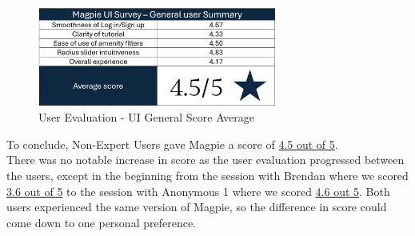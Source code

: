 \begin{figure}[h!]
    \centering
    \includegraphics[width=0.7\textwidth]{images/survey-casual-summary.png}
    \caption{User Evaluation - UI General Score Average}
\end{figure}

To conclude, Non-Expert Users gave Magpie a score of \underline{4.5 out of 5}.\\
There was no notable increase in score as the user evaluation progressed between the users, except in the beginning from the session with Brendan where we scored \underline{3.6 out of 5} to the session with Anonymous 1 where we scored \underline{4.6 out 5}. Both users experienced the same version of Magpie, so the difference in score could come down to one personal preference.